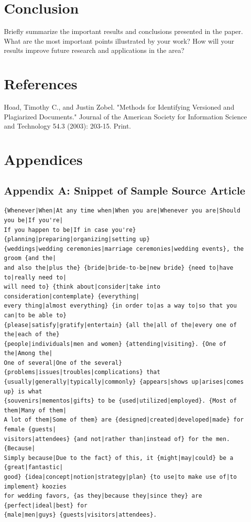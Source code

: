 \documentclass[11pt,letterpaper,oneside, titlepage]{scrartcl}
\begin{document}
\section{Conclusion}

Briefly summarize the important results and conclusions presented in the paper. What are the most important points illustrated by your work? How will your results improve future research and applications in the area?

\section{References}

Hoad, Timothy C., and Justin Zobel. "Methods for Identifying Versioned and Plagiarized Documents." Journal of the American Society for Information Science and Technology 54.3 (2003): 203-15. Print.

\section{Appendices}

\subsection{Appendix A: Snippet of Sample Source Article}

\begin{verbatim}{Whenever|When|At any time when|When you are|Whenever you are|Should you be|If you're|
If you happen to be|If in case you're} {planning|preparing|organizing|setting up} 
{weddings|wedding ceremonies|marriage ceremonies|wedding events}, the groom {and the|
and also the|plus the} {bride|bride-to-be|new bride} {need to|have to|really need to|
will need to} {think about|consider|take into consideration|contemplate} {everything|
every thing|almost everything} {in order to|as a way to|so that you can|to be able to}
{please|satisfy|gratify|entertain} {all the|all of the|every one of the|each of the}
{people|individuals|men and women} {attending|visiting}. {One of the|Among the|
One of several|One of the several} {problems|issues|troubles|complications} that 
{usually|generally|typically|commonly} {appears|shows up|arises|comes up} is what 
{souvenirs|mementos|gifts} to be {used|utilized|employed}. {Most of them|Many of them|
A lot of them|Some of them} are {designed|created|developed|made} for female {guests|
visitors|attendees} {and not|rather than|instead of} for the men. {Because|
Simply because|Due to the fact} of this, it {might|may|could} be a {great|fantastic|
good} {idea|concept|notion|strategy|plan} {to use|to make use of|to implement} koozies
for wedding favors, {as they|because they|since they} are {perfect|ideal|best} for 
{male|men|guys} {guests|visitors|attendees}.
\end{verbatim}
 
\end{document}

